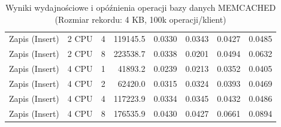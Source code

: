 \begin{table}[ht]
{\begin{tabular}{llcrrrrr}
Zapis (Insert) & 2 CPU & 4 & 119145.5 & 0.0330 & 0.0343 & 0.0427 & 0.0485 \\
Zapis (Insert) & 2 CPU & 8 & 223538.7 & 0.0338 & 0.0201 & 0.0494 & 0.0632 \\
Zapis (Insert) & 4 CPU & 1 & 41893.2 & 0.0239 & 0.0213 & 0.0352 & 0.0405 \\
Zapis (Insert) & 4 CPU & 2 & 62420.0 & 0.0315 & 0.0324 & 0.0393 & 0.0469 \\
Zapis (Insert) & 4 CPU & 4 & 117223.9 & 0.0334 & 0.0345 & 0.0432 & 0.0486 \\
Zapis (Insert) & 4 CPU & 8 & 176535.9 & 0.0430 & 0.0427 & 0.0661 & 0.0894 \\
\bottomrule
\end{tabular}%
}
\caption{Wyniki wydajnościowe i opóźnienia operacji bazy danych MEMCACHED (Rozmiar rekordu: 4 KB, 100k operacji/klient)}
\label{tab:latency_memcached_medium_100000}
\end{table}
